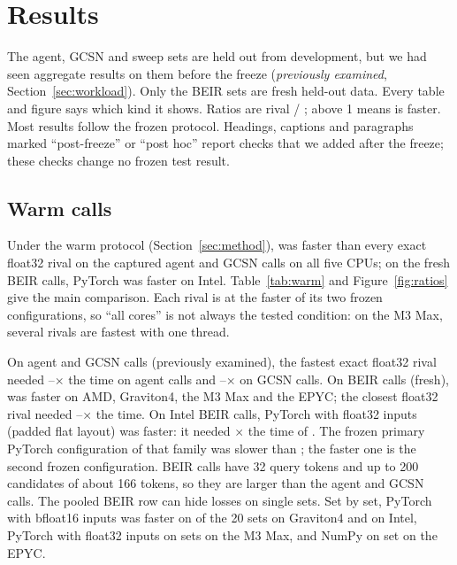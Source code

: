 \section{Results}
\label{sec:results}

The agent, GCSN and sweep sets are held out from development, but we had seen aggregate results on them before the freeze (\emph{previously examined}, Section~\ref{sec:workload}).
Only the BEIR sets are fresh held-out data.
Every table and figure says which kind it shows.
Ratios are rival / \sweet; above 1 means \sweet is faster.
Most results follow the frozen protocol.
Headings, captions and paragraphs marked ``post-freeze'' or ``post hoc'' report checks that we added after the freeze; these checks change no frozen test result.

\subsection{Warm calls}
\label{sec:warm}

Under the warm protocol (Section~\ref{sec:method}), \sweet was faster than every exact float32 rival on the captured agent and GCSN calls on all five CPUs; on the fresh BEIR calls, PyTorch was faster on Intel.
Table~\ref{tab:warm} and Figure~\ref{fig:ratios} give the main comparison.
Each rival is at the faster of its two frozen configurations, so ``all cores'' is not always the tested condition: on the M3 Max, several rivals are fastest with one thread.

On agent and GCSN calls (previously examined), the fastest exact float32 rival needed --$\times$ the time on agent calls and --$\times$ on GCSN calls.
On BEIR calls (fresh), \sweet was faster on AMD, Graviton4, the M3 Max and the EPYC; the closest float32 rival needed --$\times$ the time.
On Intel BEIR calls, PyTorch with float32 inputs (padded flat layout) was faster: it needed $\times$ the time of \sweet.
The frozen primary PyTorch configuration of that family was slower than \sweet; the faster one is the second frozen configuration.
BEIR calls have 32 query tokens and up to 200 candidates of about 166 tokens, so they are larger than the agent and GCSN calls.
The pooled BEIR row can hide losses on single sets. Set by set, PyTorch with bfloat16 inputs was faster on  of the 20 sets on Graviton4 and  on Intel, PyTorch with float32 inputs on  sets on the M3 Max, and NumPy on  set on the EPYC.

